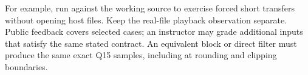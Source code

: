 For example, run  against the working source to exercise forced
short transfers without opening host files. Keep the real-file playback observation
separate. Public feedback covers selected cases; an instructor may grade additional
inputs that satisfy the same stated contract. An equivalent block or direct filter
must produce the same exact Q15 samples, including at rounding and clipping boundaries.
